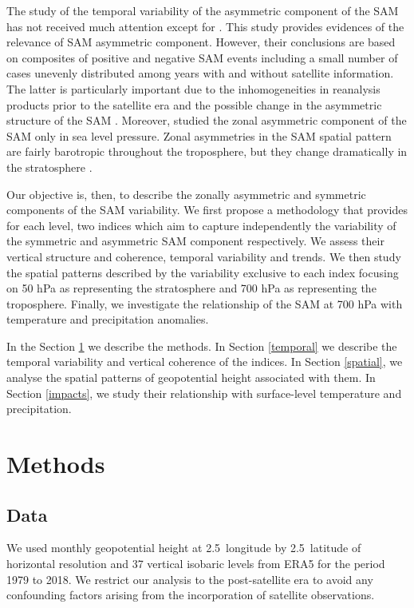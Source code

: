 \documentclass[smallextended]{svjour3}       %
\begin{document}
The study of the temporal variability of the asymmetric component of the SAM has not received much attention except for \citet{fogt2012}. This study provides evidences of the relevance of SAM asymmetric component. However, their conclusions are based on composites of positive and negative SAM events including a small number of cases unevenly distributed among years with and without satellite information. The latter is particularly important due to the inhomogeneities in reanalysis products prior to the satellite era and the possible change in the asymmetric structure of the SAM \citep{silvestri2009}. Moreover, \citet{fogt2012} studied the zonal asymmetric component of the SAM only in sea level pressure. Zonal asymmetries in the SAM spatial pattern are fairly barotropic throughout the troposphere, but they change dramatically in the stratosphere \citep{baldwin2009}.

Our objective is, then, to describe the zonally asymmetric and symmetric components of the SAM variability. We first propose a methodology that provides for each level, two indices which aim to capture independently the variability of the symmetric and asymmetric SAM component respectively. We assess their vertical structure and coherence, temporal variability and trends. We then study the spatial patterns described by the variability exclusive to each index focusing on 50 hPa as representing the stratosphere and 700 hPa as representing the troposphere. Finally, we investigate the relationship of the SAM at 700 hPa with temperature and precipitation anomalies.

In the Section \ref{methods} we describe the methods. In Section \ref{temporal} we describe the temporal variability and vertical coherence of the indices. In Section \ref{spatial}, we analyse the spatial patterns of geopotential height associated with them. In Section \ref{impacts}, we study their relationship with surface-level temperature and precipitation.

\hypertarget{methods}{%
\section{Methods}\label{methods}}

\hypertarget{data}{%
\subsection{Data}\label{data}}

We used monthly geopotential height at 2.5\degree~longitude by 2.5\degree~latitude of horizontal resolution and 37 vertical isobaric levels from ERA5 \citep{hersbach2020} for the period 1979 to 2018. We restrict our analysis to the post-satellite era to avoid any confounding factors arising from the incorporation of satellite observations.
\end{document}

